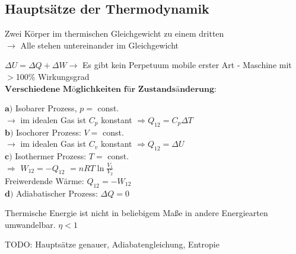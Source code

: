 \begin{sectionbox}
	\subsection{Hauptsätze der Thermodynamik}

	\begin{cookbox}{}
		\item[0.] Zwei Körper im thermischen Gleichgewicht zu einem dritten\\ $\rightarrow$ Alle stehen untereinander im Gleichgewicht
		\item[1.] $\Delta U = \Delta Q + \Delta W \rightarrow $ Es gibt kein Perpetuum mobile erster Art - Maschine mit $>$100\% Wirkungsgrad\\
		$\textbf{Verschiedene Möglichkeiten für Zustandsänderung:}$
		\begin{sectionbox}
			$\textbf{a)}$ Isobarer Prozess, $p =$ const.\\ $\rightarrow$ im idealen Gas ist $C_p$ konstant $\Rightarrow Q_{12} = C_p \Delta T$\\
			$\textbf{b)}$ Isochorer Prozess: $V =$ const.\\ $\rightarrow$ im idealen Gas ist $C_v$ konstant $\Rightarrow Q_{12} = \Delta U$\\
			$\textbf{c)}$ Isothermer Prozess: $T =$ const.\\ $\Rightarrow$ $W_{12} = -Q_{12}$
			$ =n RT \ln\frac{V_1}{V_2}$
			\\Freiwerdende Wärme: $Q_{12} = -W_{12}$\\
			$\textbf{d)}$ Adiabatischer Prozess: $\Delta Q = 0$\\
		\end{sectionbox}
		\item[2.] Thermische Energie ist nicht in beliebigem Maße in andere Energiearten umwandelbar. $\eta < 1$
	\end{cookbox}
\end{sectionbox}

TODO: Hauptsätze genauer, Adiabatengleichung, Entropie